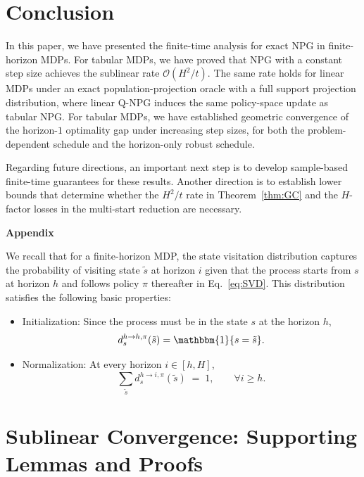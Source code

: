 \documentclass[11pt]{article}
\begin{document}
\section{Conclusion}\label{sec:conclusion}
In this paper, we have presented the finite-time analysis for exact NPG in
finite-horizon MDPs. For tabular MDPs, we have proved that NPG with a constant step size
achieves the sublinear rate $\mathcal{O}(H^2/t)$. The same rate holds for
linear MDPs under an exact population-projection oracle with a full support
projection distribution, where linear Q-NPG induces the same policy-space
update as tabular NPG. For tabular MDPs, we have established geometric convergence of the horizon-$1$
optimality gap under increasing step sizes, for both the problem-dependent
schedule and the horizon-only robust schedule. 

Regarding future directions, an important next step is to develop sample-based
finite-time guarantees for these results. Another direction is to establish lower bounds that
determine whether the $H^2/t$ rate in Theorem~\ref{thm:GC} and the $H$-factor losses in the multi-start reduction are necessary.




\clearpage
\appendix

\begin{center}
    {\LARGE\bfseries Appendix}
\end{center}

We recall that for a finite-horizon MDP, the state visitation distribution captures the probability of visiting state $\tilde{s}$ at horizon $i$ given that the process starts from $s$ at horizon $h$ and follows policy $\pi$ thereafter in Eq.~\eqref{eq:SVD}. This distribution satisfies the following basic properties:
\begin{itemize}
     \item Initialization: Since the process must be in the state $s$ at the horizon $h$, 
    \[
    d^{h \to h, \pi}_s(\tilde{s}) = \mathbbm{1}\{s=\tilde{s}\}.
    \]
    \item Normalization: At every horizon $i \in [h,H]$,
    \[
    \sum_{\tilde{s}} d^{h \to i, \pi}_s(\tilde{s}) \;=\; 1, \qquad \forall i \ge h.
    \]
\end{itemize}
\section{Sublinear Convergence: Supporting Lemmas and Proofs} \label{app:sublin}
\end{document}
